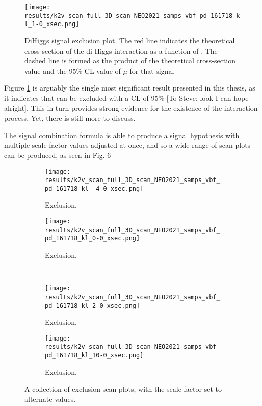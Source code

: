     \begin{figure}
        \texttt{[image: results/k2v\_scan\_full\_3D\_scan\_NEO2021\_samps\_vbf\_pd\_161718\_kl\_1-0\_xsec.png]}
        \caption{DiHiggs signal \kvv exclusion plot.
            The red line indicates the theoretical cross-section of the di-Higgs interaction as a function of \kvv.
            The dashed line is formed as the product of the theoretical cross-section value
                and the 95\% CL value of $\mu$ for that \kvv signal}
        \label{fig:kvv_SM_scan}
    \end{figure}

    Figure \ref{fig:kvv_SM_scan} is arguably the single most significant result presented in this thesis,
        as it indicates that  can be excluded with a CL of 95\% [To Steve: look I can hope alright].
    This in turn provides strong evidence for the existence of the \HHVV interaction process.
    Yet, there is still more to discuss.

    The signal combination formula is able to produce a signal hypothesis with multiple scale factor values adjusted at once,
        and so a wide range of \kvv scan plots can be produced, as seen in Fig. \ref{fig:kvv_multi_kl}

    \begin{figure}
        \centering
        \begin{subfigure}{0.48\textwidth} 
            \texttt{[image: results/k2v\_scan\_full\_3D\_scan\_NEO2021\_samps\_vbf\_pd\_161718\_kl\_-4-0\_xsec.png]}
            \caption{\kvv Exclusion, }
            \label{fig:kvv_scan_kl0}
        \end{subfigure}
        \begin{subfigure}{0.48\textwidth} 
            \texttt{[image: results/k2v\_scan\_full\_3D\_scan\_NEO2021\_samps\_vbf\_pd\_161718\_kl\_0-0\_xsec.png]}
            \caption{\kvv Exclusion, }
            \label{fig:kvv_scan_kl1}
        \end{subfigure} \\
        \begin{subfigure}{0.48\textwidth}
            \texttt{[image: results/k2v\_scan\_full\_3D\_scan\_NEO2021\_samps\_vbf\_pd\_161718\_kl\_2-0\_xsec.png]}
            \caption{\kvv Exclusion, }
            \label{fig:kvv_scan_kl2}
        \end{subfigure}
        \begin{subfigure}{0.48\textwidth}
            \texttt{[image: results/k2v\_scan\_full\_3D\_scan\_NEO2021\_samps\_vbf\_pd\_161718\_kl\_10-0\_xsec.png]}
            \caption{\kvv Exclusion, }
            \label{fig:kvv_scan_kl10}
        \end{subfigure}
        \caption{
            A collection of \kvv exclusion scan plots, with the \kl scale factor set to alternate values.
        }\label{fig:kvv_multi_kl}
    \end{figure}

